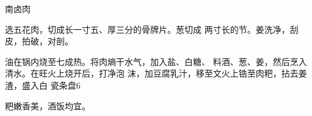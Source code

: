 \begin{recipe}{南卤肉}

\ingredients




\cooking

\step 	选五花肉，切成长一寸五、厚三分的骨牌片。葱切成 两寸长的节。姜洗净，刮皮，拍破，对剖。

\step 	油在锅内烧至七成热。将肉熵干水气，加入盐、白糖、 料酒、葱、姜，然后烹入清水。在旺火上烧开后，打净泡 沫，加豆腐乳汁，移至文火上锆至肉粑，拈去姜渣，盛入白 瓷条盘6

\notes

粑嫩香美，酒饭均宜。

\end{recipe}

